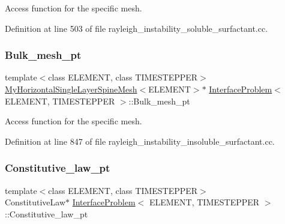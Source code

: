 Access function for the specific mesh. 



Definition at line 503 of file rayleigh\+\_\+instability\+\_\+soluble\+\_\+surfactant.\+cc.

\mbox{\label{classInterfaceProblem_a6df8c17d561715be1e6e7badfe339122}} 
\subsubsection{\texorpdfstring{Bulk\+\_\+mesh\+\_\+pt}{Bulk\_mesh\_pt}\hspace{0.1cm}{\footnotesize\ttfamily [3/3]}}
{\footnotesize\ttfamily template$<$class E\+L\+E\+M\+E\+NT, class T\+I\+M\+E\+S\+T\+E\+P\+P\+ER$>$ \\
\hyperlink{classoomph_1_1MyHorizontalSingleLayerSpineMesh}{My\+Horizontal\+Single\+Layer\+Spine\+Mesh}$<$E\+L\+E\+M\+E\+NT$>$$\ast$ \hyperlink{classInterfaceProblem}{Interface\+Problem}$<$ E\+L\+E\+M\+E\+NT, T\+I\+M\+E\+S\+T\+E\+P\+P\+ER $>$\+::Bulk\+\_\+mesh\+\_\+pt}



Access function for the specific mesh. 



Definition at line 847 of file rayleigh\+\_\+instability\+\_\+insoluble\+\_\+surfactant.\+cc.

\mbox{\label{classInterfaceProblem_a5bf645cbdbf7775ab6438be324caf3c3}} 
\subsubsection{\texorpdfstring{Constitutive\+\_\+law\+\_\+pt}{Constitutive\_law\_pt}}
{\footnotesize\ttfamily template$<$class E\+L\+E\+M\+E\+NT, class T\+I\+M\+E\+S\+T\+E\+P\+P\+ER$>$ \\
Constitutive\+Law$\ast$ \hyperlink{classInterfaceProblem}{Interface\+Problem}$<$ E\+L\+E\+M\+E\+NT, T\+I\+M\+E\+S\+T\+E\+P\+P\+ER $>$\+::Constitutive\+\_\+law\+\_\+pt}



